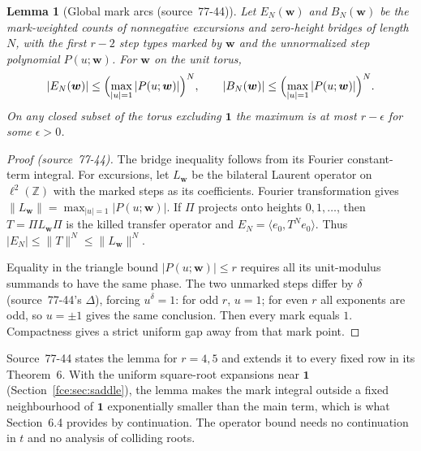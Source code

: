 \documentclass[11pt,a4paper]{article}
\numberwithin{equation}{section}
\newtheorem{lemma}[theorem]{Lemma}
\theoremstyle{definition}\newtheorem{definition}[theorem]{Definition}
\theoremstyle{remark}\newtheorem{remark}[theorem]{Remark}
\newcommand{\Z}{\mathbb Z}
\begin{document}
\begin{lemma}[Global mark arcs (source~77-44)]\label{fce:ba:lem:global}
Let $E_N(\boldsymbol w)$ and $B_N(\boldsymbol w)$ be the mark-weighted counts
of nonnegative excursions and zero-height bridges of length $N$, with the
first $r-2$ step types marked by $\boldsymbol w$ and the unnormalized step
polynomial $P(u;\boldsymbol w)$. For $\boldsymbol w$ on the unit torus,
\[
 |E_N(\boldsymbol w)|\le\Bigl(\max_{|u|=1}|P(u;\boldsymbol w)|\Bigr)^N,
 \qquad
 |B_N(\boldsymbol w)|\le\Bigl(\max_{|u|=1}|P(u;\boldsymbol w)|\Bigr)^N .
\]
On any closed subset of the torus excluding $\boldsymbol1$ the maximum is at
most $r-\epsilon$ for some $\epsilon>0$.
\end{lemma}
\begin{proof}[Proof (source~77-44)]
The bridge inequality follows from its Fourier constant-term integral. For
excursions, let $L_{\boldsymbol w}$ be the bilateral Laurent operator on
$\ell^2(\Z)$ with the marked steps as its coefficients. Fourier
transformation gives $\|L_{\boldsymbol w}\|=\max_{|u|=1}|P(u;\boldsymbol w)|$.
If $\Pi$ projects onto heights $0,1,\ldots$, then $T=\Pi L_{\boldsymbol w}\Pi$
is the killed transfer operator and $E_N=\langle e_0,T^Ne_0\rangle$. Thus
$|E_N|\le\|T\|^N\le\|L_{\boldsymbol w}\|^N$.

Equality in the triangle bound $|P(u;\boldsymbol w)|\le r$ requires all its
unit-modulus summands to have the same phase. The two unmarked steps differ
by $\delta$ (source~77-44's $\Delta$), forcing $u^\delta=1$: for odd $r$,
$u=1$; for even $r$ all exponents are odd, so $u=\pm1$ gives the same
conclusion. Then every mark equals $1$. Compactness gives a strict uniform
gap away from that mark point.
\end{proof}
Source~77-44 states the lemma for $r=4,5$ and extends it to every fixed
row in its Theorem~6. With the uniform square-root expansions near
$\boldsymbol1$ (Section~\ref{fce:sec:saddle}), the lemma makes the mark
integral outside a fixed neighbourhood of $\boldsymbol1$ exponentially
smaller than the main term, which is what Section~6.4 provides by
continuation. The operator bound needs no continuation in $t$ and no
analysis of colliding roots.
\end{document}
